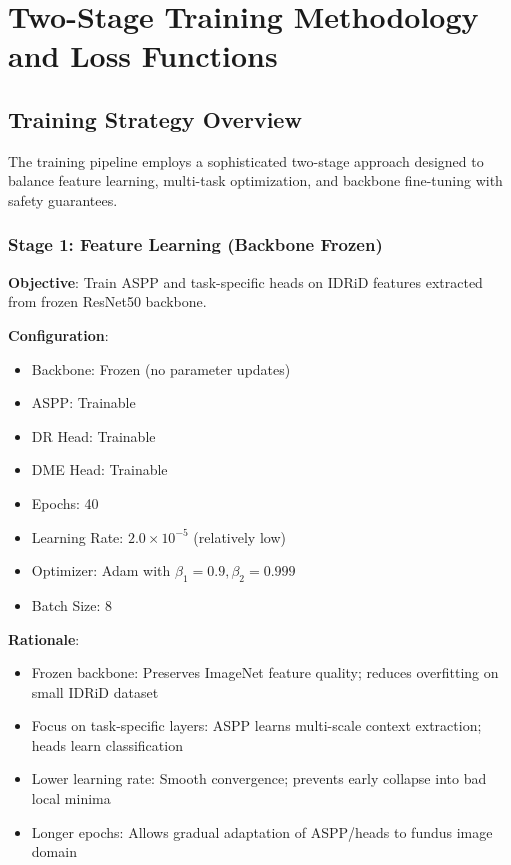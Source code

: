 

\section{Two-Stage Training Methodology and Loss Functions}

\subsection{Training Strategy Overview}

The training pipeline employs a sophisticated two-stage approach designed to balance feature learning, multi-task optimization, and backbone fine-tuning with safety guarantees.

\subsubsection{Stage 1: Feature Learning (Backbone Frozen)}

\textbf{Objective}: Train ASPP and task-specific heads on IDRiD features extracted from frozen ResNet50 backbone.

\textbf{Configuration}:
\begin{itemize}
    \item Backbone: Frozen (no parameter updates)
    \item ASPP: Trainable
    \item DR Head: Trainable
    \item DME Head: Trainable
    \item Epochs: 40
    \item Learning Rate: $2.0 \times 10^{-5}$ (relatively low)
    \item Optimizer: Adam with $\beta_1=0.9, \beta_2=0.999$
    \item Batch Size: 8
\end{itemize}

\textbf{Rationale}:
\begin{itemize}
    \item Frozen backbone: Preserves ImageNet feature quality; reduces overfitting on small IDRiD dataset
    \item Focus on task-specific layers: ASPP learns multi-scale context extraction; heads learn classification
    \item Lower learning rate: Smooth convergence; prevents early collapse into bad local minima
    \item Longer epochs: Allows gradual adaptation of ASPP/heads to fundus image domain
\end{itemize}

